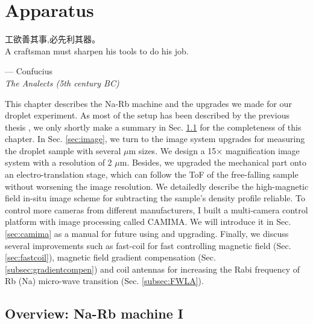 \chapter{Apparatus}
\label{Chap_Apparatus}

\setlength{\unitlength}{1pt}
\setlength{\epigraphwidth}{10.5cm}
\epigraph{工欲善其事,必先利其器。\\ A craftsman must sharpen his tools to do his job.}{--- Confucius\\ \textit{The Analects (5th century BC)}}

This chapter describes the Na-Rb machine and the upgrades we made for our droplet experiment. As most of the setup has been described by the previous thesis \cite{WangFudong2016Soau,LiXiaoke2015Chsd}, we only shortly make a summary in Sec. \ref{sec:machine} for the completeness of this chapter. In Sec. \ref{sec:image}, we turn to the image system upgrades for measuring the droplet sample with several $\mu$m sizes. We design a 15$\times$ magnification image system with a resolution of 2 $\mu$m. Besides, we upgraded the mechanical part onto an electro-translation stage, which can follow the ToF of the free-falling sample without worsening the image resolution. We detailedly describe the high-magnetic field in-situ image scheme for subtracting the sample's density profile reliable. To control more cameras from different manufacturers, I built a multi-camera control platform with image processing called CAMIMA. We will introduce it in Sec. \ref{sec:camima} as a manual for future using and upgrading. Finally, we discuss several improvements such as fast-coil for fast controlling magnetic field (Sec. \ref{sec:fastcoil}), magnetic field gradient compensation (Sec. \ref{subsec:gradientcompen}) and coil antennas for increasing the Rabi frequency of Rb (Na) micro-wave transition (Sec. \ref{subsec:FWLA}).

\section{Overview: Na-Rb machine I}
\label{sec:machine}

